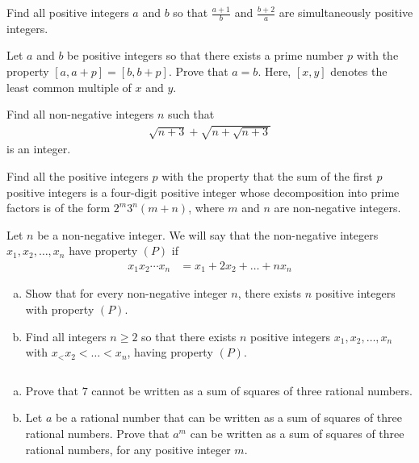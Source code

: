 \begin{problem}
	Find all positive integers $a$ and $b$ so that $\frac{a + 1}{b}$ and $\frac{b+2}{a}$ are simultaneously positive integers.
\end{problem}

\begin{problem}
	Let $a$ and $b$ be positive integers so that there exists a prime number $p$ with the property $[a, a + p] = [b, b + p]$. Prove that $a = b$. Here, $[x, y]$ denotes the least common multiple of $x$ and $y$.
\end{problem}

\begin{problem}
	Find all non-negative integers $n$ such that
	\begin{align*}
		\sqrt{n+3} + \sqrt{n+\sqrt{n+3}}
	\end{align*}
	is an integer.
\end{problem}

\begin{problem}
	Find all the positive integers $p$ with the property that the sum of the first $p$ positive integers is a four-digit positive integer whose decomposition into prime factors is of the form $2^m3^n(m + n)$, where $m$ and $n$ are non-negative integers.
\end{problem}

\begin{problem}
	Let $n$ be a non-negative integer. We will say that the non-negative integers $x_1, x_2, \dots, x_n$ have property $(P)$ if
		\begin{align*}
			x_1x_2 \cdots x_n
				& = x_1 + 2x_2  + \ldots + nx_n
		\end{align*}
	\begin{enumerate}[(a)]
		\item  Show that for every non-negative integer $n$, there exists $n$ positive integers with property $(P)$.
		\item Find all integers $n \geq 2$ so that there exists $n$ positive integers $x_1, x_2, \dots, x_n$	with $x_< x_2< \dots< x_n$, having property $(P)$.
	\end{enumerate}
\end{problem}

\begin{problem}
	$ $
	\begin{enumerate}[(a)]
		\item Prove that $7$ cannot be written as a sum of squares of three rational numbers.
		\item Let $a$ be a rational number that can be written as a sum of squares of three rational numbers. Prove that $a^m$ can be written as a sum of squares of three rational numbers, for any positive integer $m$.
	\end{enumerate}
\end{problem}

